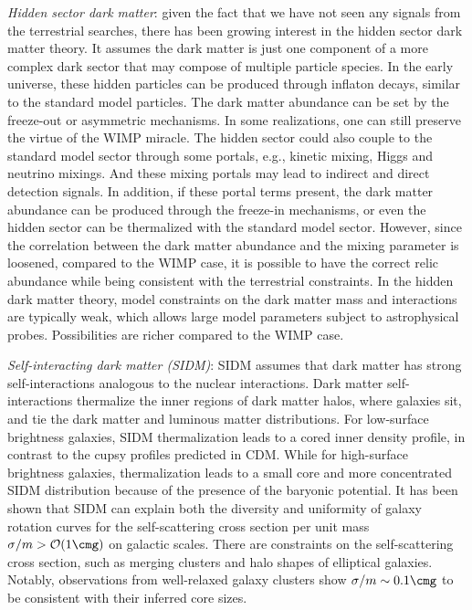 {\it Hidden sector dark matter}: given the fact that we have not seen any signals from the terrestrial searches, there has been growing interest in the hidden sector dark matter theory. It assumes the dark matter is just one component of a more complex dark sector that may compose of multiple particle species. In the early universe, these hidden particles can be produced through inflaton decays, similar to the standard model particles. The dark matter abundance can be set by the freeze-out or asymmetric mechanisms. In some realizations, one can still preserve the virtue of the WIMP miracle. The hidden sector could also couple to the standard model sector through some portals, e.g., kinetic mixing, Higgs and neutrino mixings. And these mixing portals may lead to indirect and direct detection signals. In addition, if these portal terms present, the dark matter abundance can be produced through the freeze-in mechanisms, or even the hidden sector can be thermalized with the standard model sector. However, since the correlation between the dark matter abundance and the mixing parameter is loosened, compared to the WIMP case, it is possible to have the correct relic abundance while being consistent with the terrestrial constraints. In the hidden dark matter theory, model constraints on the dark matter mass and interactions are typically weak, which allows large model parameters subject to astrophysical probes. Possibilities are richer compared to the WIMP case.

{\it Self-interacting dark matter (SIDM)}: SIDM assumes that dark matter has strong self-interactions analogous to the nuclear interactions. Dark matter self-interactions thermalize the inner regions of dark matter halos, where galaxies sit, and tie the dark matter and luminous matter distributions. For low-surface brightness galaxies, SIDM thermalization leads to a cored inner density profile, in contrast to the cupsy profiles predicted in CDM. While for high-surface brightness galaxies, thermalization leads to a small core and more concentrated SIDM distribution because of the presence of the baryonic potential. It has been shown that SIDM can explain both the diversity and uniformity of galaxy rotation curves for the self-scattering cross section per unit mass $\sigma/m>\mathcal{O}(1\cmg)$ on galactic scales. There are constraints on the self-scattering cross section, such as merging clusters and halo shapes of elliptical galaxies. Notably, observations from well-relaxed galaxy clusters show $\sigma/m\sim0.1\cmg$ to be consistent with their inferred core sizes. 

